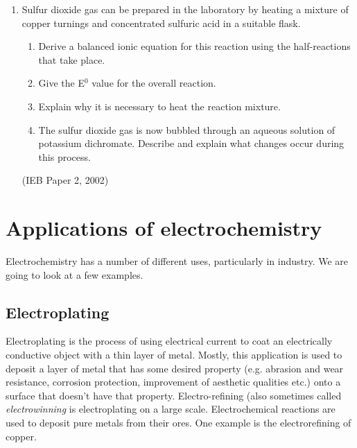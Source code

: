 {\begin{enumerate}
	\begin{enumerate}
	\item{Laboratory solutions of aqueous potassium dichromate are not acidified}
	\item{The E$^{0}$ value for this reaction is only +0.10V}
	\item{The activation energy is too low}
	\item{The reaction is non-spontaneous}
	\end{enumerate}

(IEB Paper 2, 2002)

\item{Sulfur dioxide gas can be prepared in the laboratory by heating a mixture of copper turnings and concentrated sulfuric acid in a suitable flask.}	
	\begin{enumerate}
	\item{Derive a balanced ionic equation for this reaction using the half-reactions that take place.}
	\item{Give the E$^{0}$ value for the overall reaction.}
	\item{Explain why it is necessary to heat the reaction mixture.}
	\item{The sulfur dioxide gas is now bubbled through an aqueous solution of potassium dichromate. Describe and explain what changes occur during this process.}
	\end{enumerate}
(IEB Paper 2, 2002)
\end{enumerate}
}






\section{Applications of electrochemistry}
\label{sec:electrochemical:applications}

Electrochemistry has a number of different uses, particularly in industry. We are going to look at a few examples.

\subsection{Electroplating}

Electroplating is the process of using electrical current to coat an electrically conductive object with a thin layer of metal. Mostly, this application is used to deposit a layer of metal that has some desired property (e.g. abrasion and wear resistance, corrosion protection, improvement of aesthetic qualities etc.) onto a surface that doesn't have that property. Electro-refining (also sometimes called \textit{electrowinning} is electroplating on a large scale. Electrochemical reactions are used to deposit pure metals from their ores. One example is the electrorefining of copper.\\

